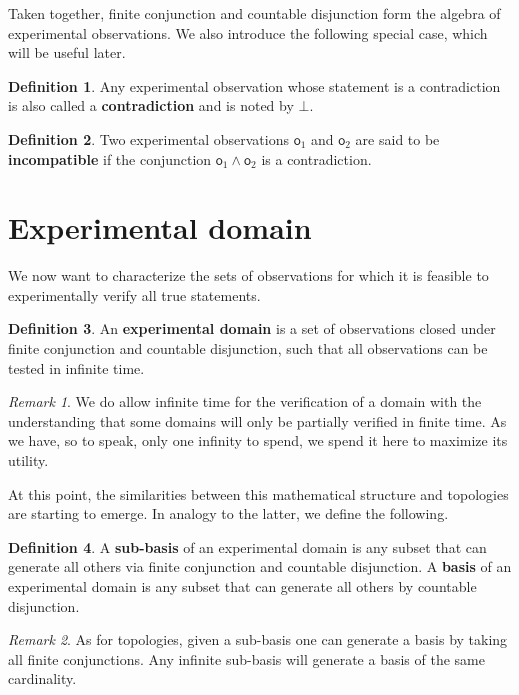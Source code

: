 \documentclass[review]{elsarticle}
\theoremstyle{plain}%
\theoremstyle{definition}
\newtheorem{defn}{Definition}[section]
\theoremstyle{remark}
\newtheorem*{rem}{Remark}
\begin{document}
Taken together, finite conjunction and countable disjunction form the algebra of experimental observations. We also introduce the following special case, which will be useful later.

\begin{defn}
Any experimental observation whose statement is a contradiction is also called a \textbf{contradiction} and is noted by $\bot$.
\end{defn}

\begin{defn}
Two experimental observations $\mathsf{o}_1$ and $\mathsf{o}_2$ are said to be \textbf{incompatible} if the conjunction $\mathsf{o}_1\wedge\mathsf{o}_2$ is a contradiction.
\end{defn}


\section{Experimental domain}

We now want to characterize the sets of observations for which it is feasible to experimentally verify all true statements.

\begin{defn}
	An \textbf{experimental domain} is a set of observations closed under finite conjunction and countable disjunction, such that all observations can be tested in infinite time. 
\end{defn}

\begin{rem}
	We do allow infinite time for the verification of a domain with the understanding that some domains will only be partially verified in finite time. As we have, so to speak, only one infinity to spend, we spend it here to maximize its utility.
\end{rem}

At this point, the similarities between this mathematical structure and topologies are starting to emerge. In analogy to the latter, we define the following.

\begin{defn}
	A \textbf{sub-basis} of an experimental domain is any subset that can generate all others via finite conjunction and countable disjunction. A \textbf{basis} of an experimental domain is any subset that can generate all others by countable disjunction.
\end{defn}

\begin{rem}
	As for topologies, given a sub-basis one can generate a basis by taking all finite conjunctions. Any infinite sub-basis will generate a basis of the same cardinality.
\end{rem}
\end{document}
